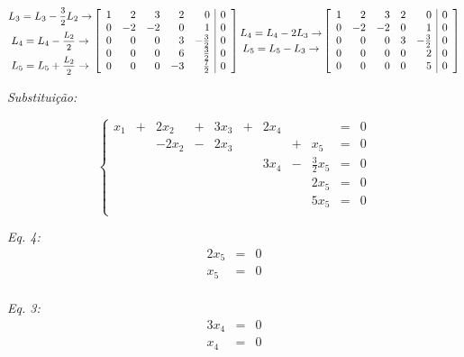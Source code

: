 \documentclass[11pt]{article}
\newenvironment{question}[1]
  {\par\addvspace{\medskipamount}
   \noindent\makebox[0pt][r]{\textbf{#1)} }\ignorespaces}
  {\par\addvspace{\medskipamount}}
\begin{document}
\begin{question}{2}
$$
\substack{
  \mbox{$L_3=L_3-\mfrac{3}{2}L_2 \rightarrow$}\\[.5em]
  \mbox{$L_4=L_4-\mfrac{L_2}{2} \rightarrow$}\\[.5em]
  \mbox{$L_5=L_5+\mfrac{L_2}{2} \rightarrow$}
}
\left[\begin{array}{rrrrr|c}
  1 & 2  & 3  & 2  & 0 & 0\\
  0 & -2 & -2 & 0  & 1 & 0\\
  0 & 0  & 0  & 3  & -\frac{3}{2} & 0\\
  0 & 0  & 0  & 6  & \frac{3}{2} & 0\\
  0 & 0  & 0  & -3 & \frac{7}{2} & 0
\end{array}\right]
\substack{
  \mbox{$L_4=L_4-2L_3 \rightarrow$}\\[.5em]
  \mbox{$L_5=L_5-L_3 \rightarrow$}
}
\left[\begin{array}{rrrrr|c}
  1 & 2  & 3  & 2  & 0 & 0\\
  0 & -2 & -2 & 0  & 1 & 0\\
  0 & 0  & 0  & 3  & -\frac{3}{2} & 0\\
  0 & 0  & 0  & 0  & 2 & 0\\
  0 & 0  & 0  & 0 & 5 & 0
\end{array}\right]
$$

\textit{Substituição:}

$$
\left\{\begin{array}{rcrcrcrcrcr}
  x_1 &+ &2x_2  &+ &3x_3 &+ &2x_4 &  &     &= &0\\
      &  &-2x_2 &- &2x_3 &  &     &+ &x_5  &= &0\\
      &  &      &  &     &  &3x_4 &- &\frac{3}{2}x_5 &= &0\\
      &  &      &  &     &  &     &  &2x_5 &= &0\\
      &  &      &  &     &  &     &  &5x_5 &= &0\\
\end{array}\right.
$$

\textit{Eq. 4:}
$$
\begin{array}{rcl}
  2x_5 &= &0\\
  x_5 &= &0\\
\end{array}
$$

\textit{Eq. 3:}
$$
\begin{array}{rcl}
  3x_4 &= &0\\
  x_4 &= &0\\
\end{array}
$$


\end{question}
\end{document}
